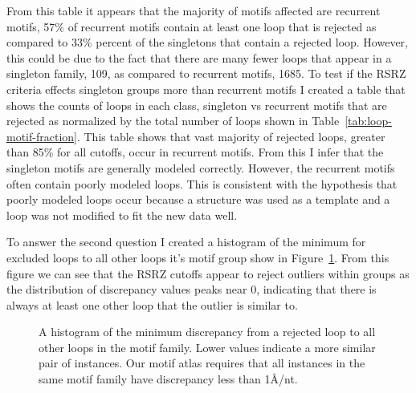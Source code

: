 From this table it appears that the majority of motifs affected are recurrent
motifs, 57\% of recurrent motifs contain at least one loop that is rejected as
compared to 33\% percent of the singletons that contain a rejected loop.
However, this could be due to the fact that there are many fewer loops that
appear in a singleton family, 109, as compared to recurrent motifs, 1685. To
test if the RSRZ criteria effects singleton groups more than recurrent motifs I
created a table that shows the counts of loops in each class, singleton vs
recurrent motifs that are rejected as normalized by the total number of loops
shown in Table~\ref{tab:loop-motif-fraction}. This table shows that vast
majority of rejected loops, greater than 85\% for all cutoffs, occur in
recurrent motifs. From this I infer that the singleton motifs are generally
modeled correctly. However, the recurrent motifs  often contain poorly  modeled
loops. This is consistent with the hypothesis that poorly modeled loops occur
because a structure was used as a template and a loop was not modified to fit
the new data well.  

\begin{table}
  \caption{A table showing the counts of rejected loops in each type of motif,
    singleton or recurrent. The percents in the parenthesis indicate the percent
    of rejected loops that occur in each type of motif. Thus the upper row shows
    that there are 419 loops rejected using the RSRZ > 1 cutoff, of those 36 or
    9\%, 36/419, occur in singleton motifs while 383 or 91\%, 383/419, occur in
  recurrent motifs. }
  \label{tab:loop-motif-fraction}
\end{table}

To answer the second question I created a histogram of the minimum for excluded
loops to all other loops it’s motif group show in
Figure~\ref{fig:exclude-min-disc}. From this figure we can see that the RSRZ
cutoffs appear to reject outliers within groups as the distribution of
discrepancy values peaks near 0, indicating that there is always at least one
other loop that the outlier is similar to. 

\begin{figure}
  \caption{A histogram of the minimum discrepancy from a rejected loop to all
    other loops in the motif family. Lower values indicate a more similar pair
    of instances. Our motif atlas requires that all instances in the same motif
  family have discrepancy less than 1{\AA}/nt.}
  \label{fig:exclude-min-disc}
\end{figure}

